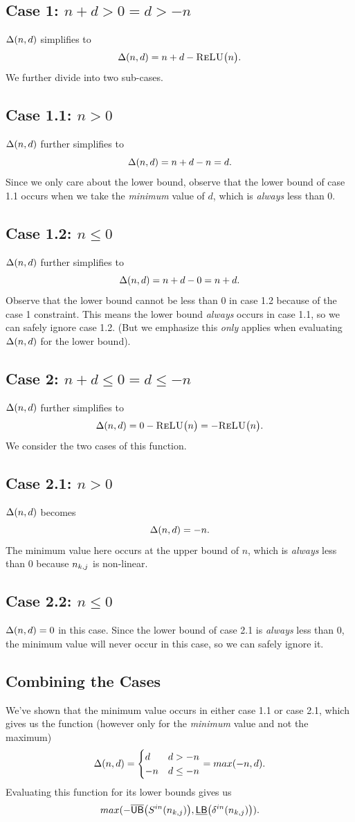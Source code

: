 \subsection*{Case 1: $ n + d > 0 = d > -n $}
$ \Delta(n,d) $ simplifies to
\[
	\Delta(n,d) = n + d - \textsc{ReLU}\big(n\big).
\]
We further divide into two sub-cases.

\subsection*{Case 1.1: $ n > 0 $}
$ \Delta(n,d) $ further simplifies to
\[
	\Delta(n,d) = n + d - n = d.
\]
Since we only care about the lower bound, observe that the lower bound of
case 1.1 occurs when we take the \textit{minimum} value of $ d $, which is \textit{always} less than 0.

\subsection*{Case 1.2: $ n \leq 0 $}
$ \Delta(n,d) $ further simplifies to
\[
	\Delta(n,d) = n + d - 0 = n + d.
\]
Observe that the lower bound cannot be less than 0 in case 1.2 because of the case 1 constraint.
This means the lower bound \textit{always} occurs in case 1.1, so we can safely ignore case 1.2. (But we emphasize this \textit{only} applies when evaluating $ \Delta(n,d) $ for the lower bound).

\subsection*{Case 2: $ n + d \leq 0 = d \leq -n $}
$ \Delta(n,d) $ further simplifies to
\[
	\Delta(n,d) = 0 - \textsc{ReLU}\big(n\big) = -\textsc{ReLU}\big(n\big).
\]
We consider the two cases of this function.
\subsection*{Case 2.1: $ n > 0 $}
$ \Delta(n,d) $ becomes
\[
	\Delta(n,d) = -n.
\]
The minimum value here occurs at the upper bound of $ n $, which is \textit{always} less than 0 because $ n_{k,j} $ is non-linear.

\subsection*{Case 2.2: $ n \leq 0 $}
$ \Delta(n,d) = 0 $ in this case. Since the lower bound of case 2.1 is \textit{always} less than 0, the minimum value will never occur in this case, so we can safely ignore it.


\subsection*{Combining the Cases}
We've shown that the minimum value occurs in either case 1.1 or case 2.1, which gives us the function (however only for the \textit{minimum} value and not the maximum)
\[
\Delta(n,d) = \begin{cases}
d & d > -n\\
-n & d \leq -n
\end{cases} = max(-n,d).
\]
Evaluating this function for its lower bounds gives us
\[
 max(-\overline{\mathsf{UB}}\big(S^{in}(n_{k,j})\big), \underline{\mathsf{LB}}\big(\delta^{in}(n_{k,j})\big)).
\]

